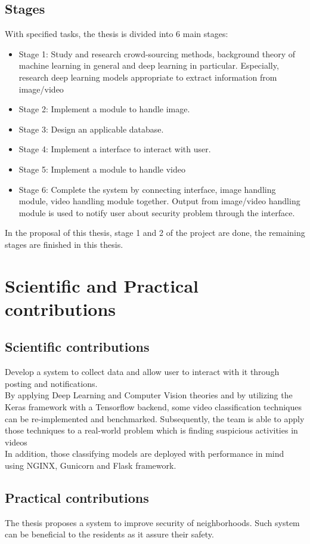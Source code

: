 \subsection{Stages}
With specified tasks, the thesis is divided into 6 main stages:
\begin{itemize}
	\item Stage 1: Study and research crowd-sourcing methods, background theory of machine learning in general and deep learning in particular. Especially, research deep learning models appropriate to extract information from image/video
	\item Stage 2: Implement a module to handle image. 
	\item Stage 3: Design an applicable database.
	\item Stage 4: Implement a interface to interact with user.
	\item Stage 5: Implement a module to handle video
	\item Stage 6: Complete the system by connecting interface, image handling module, video handling module together. Output from image/video handling module is used to notify user about security problem through the interface.
\end{itemize} 
In the proposal of this thesis, stage 1 and 2 of the project are done, the remaining stages are finished in this thesis.
  
\section{Scientific and Practical contributions}
\subsection{Scientific contributions}
Develop a system to collect data and allow user to interact with it through posting and notifications. \\
By applying Deep Learning and Computer Vision theories and by utilizing the Keras framework with a Tensorflow backend, some video classification techniques can be re-implemented and benchmarked. Subsequently, the team is able to apply those techniques to a real-world problem which is finding suspicious activities in videos \\ %
In addition, those classifying models are deployed with performance in mind using NGINX, Gunicorn and Flask framework.
\subsection{Practical contributions}
The thesis proposes a system to improve security of neighborhoods. Such system can be beneficial to the residents as it assure their safety.
